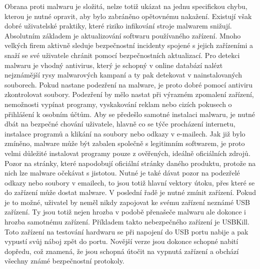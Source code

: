 Obrana proti malwaru je složitá, nelze totiž ukázat na jednu specifickou chybu, kterou je nutné opravit, aby bylo zabráněno opětovnému nakažení.
Existují však dobré uživatelské praktiky, které riziko infikování stroje malwarem snižují.
Absolutním základem je aktualizování softwaru používaného zařízení.
Mnoho velkých firem aktivně sleduje bezpečnostní incidenty spojené s jejich zařízeními a snaží se své uživatele chránit pomocí bezpečnostních aktualizací.
Pro detekci malwaru je vhodný antivirus, který je schopný v online databází nalézt nejznámější rysy malwarových kampaní a ty pak detekovat v nainstalovaných souborech.
Pokud nastane podezření na malware, je proto dobré pomocí antiviru zkontrolovat soubory.
Podezření by mělo nastat při výrazném zpomalení zařízení, nemožnosti vypínat programy, vyskakování reklam nebo cizích pokusech o přihlášení k osobním účtům.
Aby se předešlo samotné instalaci malwaru, je nutné dbát na bezpečné chování uživatele, hlavně co se týče procházení internetu, instalace programů a klikání na soubory nebo odkazy v e-mailech.
Jak již bylo zmíněno, malware může být zabalen společně s legitimním softwarem, je proto velmi důležité instalovat programy pouze z ověřených, ideálně oficiálních zdrojů.
Pozor na stránky, které napodobují oficiální stránky daného produktu, protože na nich lze malware očekávat s jistotou.
Nutné je také dávat pozor na podezřelé odkazy nebo soubory v emailech, to jsou totiž hlavní vektory útoku, přes které se do zařízení může dostat malware.
V poslední řadě je nutné zmínit  zařízení.
Pokud je to možné, uživatel by neměl nikdy zapojovat ke svému zařízení neznámé \ac{USB} zařízení.
Ty jsou totiž nejen hrozba v podobě přenašeče malwaru ale dokonce i hrozba samotnému zařízení.
Příkladem takto nebezpečného zařízení je USBKill\cite{usb_kill}.
Toto zařízení na testování hardwaru se při napojení do \ac{USB} portu nabije a pak vypustí svůj náboj zpět do portu.
Novější verze jsou dokonce schopné nabití dopředu, což znamená, že jsou schopná útočit na vypnutá zařízení a obchází všechny známé bezpečnostní protokoly.

